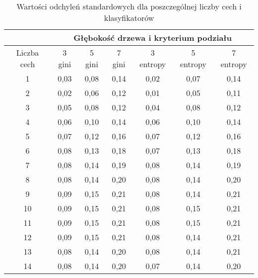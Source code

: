\documentclass{article}
\begin{document}
\begin{center}
\begin{longtable}{c|c|c|c|c|c|c|}
\caption{Wartości odchyleń standardowych dla poszczególnej liczby cech i klasyfikatorów}
		\label{tab:wyniki_odchylen}\\
\cline{2-7}
                                  & \multicolumn{6}{c|}{Głębokość drzewa i kryterium podziału}   \\ \hline
\multicolumn{1}{|c|}{Liczba cech} & 3 gini & 5 gini & 7 gini & 3 entropy & 5 entropy & 7 entropy \\ \hline
\multicolumn{1}{|c|}{1}           & 0,03   & 0,08   & 0,14   & 0,02      & 0,07      & 0,14      \\ \hline
\multicolumn{1}{|c|}{2}           & 0,02   & 0,06   & 0,12   & 0,01      & 0,05      & 0,11      \\ \hline
\multicolumn{1}{|c|}{3}           & 0,05   & 0,08   & 0,12   & 0,04      & 0,08      & 0,12      \\ \hline
\multicolumn{1}{|c|}{4}           & 0,06   & 0,10   & 0,14   & 0,06      & 0,10      & 0,14      \\ \hline
\multicolumn{1}{|c|}{5}           & 0,07   & 0,12   & 0,16   & 0,07      & 0,12      & 0,16      \\ \hline
\multicolumn{1}{|c|}{6}           & 0,08   & 0,13   & 0,18   & 0,07      & 0,13      & 0,18      \\ \hline
\multicolumn{1}{|c|}{7}           & 0,08   & 0,14   & 0,19   & 0,08      & 0,14      & 0,19      \\ \hline
\multicolumn{1}{|c|}{8}           & 0,08   & 0,14   & 0,20   & 0,08      & 0,14      & 0,20      \\ \hline
\multicolumn{1}{|c|}{9}           & 0,09   & 0,15   & 0,21   & 0,08      & 0,14      & 0,21      \\ \hline
\multicolumn{1}{|c|}{10}          & 0,09   & 0,15   & 0,21   & 0,08      & 0,15      & 0,21      \\ \hline
\multicolumn{1}{|c|}{11}          & 0,09   & 0,15   & 0,21   & 0,08      & 0,15      & 0,21      \\ \hline
\multicolumn{1}{|c|}{12}          & 0,09   & 0,15   & 0,21   & 0,08      & 0,14      & 0,21      \\ \hline
\multicolumn{1}{|c|}{13}          & 0,08   & 0,14   & 0,20   & 0,08      & 0,14      & 0,21      \\ \hline
\multicolumn{1}{|c|}{14}          & 0,08   & 0,14   & 0,20   & 0,07      & 0,14      & 0,20      \\ \hline

\end{longtable}
\end{center}
\end{document}
